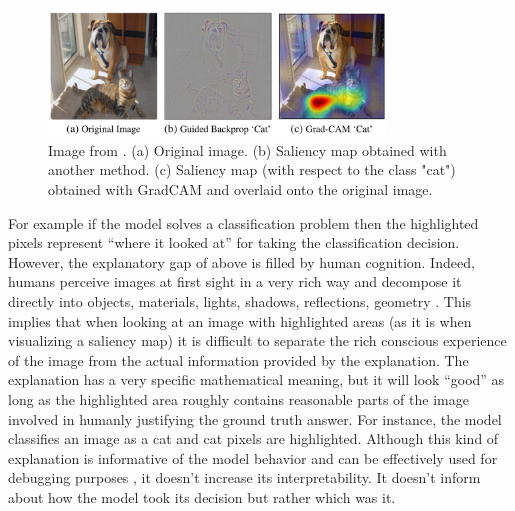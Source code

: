 \begin{figure}
    \centering
    \includegraphics[width=0.8\textwidth]{figs/grad_cam}
    \caption{
        Image from \cite{GradCAM}.
        (a) Original image.
        (b) Saliency map obtained with another method.
        (c) Saliency map (with respect to the class "cat") obtained with GradCAM and overlaid onto the original image.
        \label{fig:grad_cam}
    }
\end{figure}

For example if the model solves a classification problem then the highlighted pixels represent “where it looked at” for taking the classification decision.
However, the explanatory gap of above is filled by human cognition.
Indeed, humans perceive images at first sight in a very rich way and decompose it directly into objects, materials, lights, shadows, reflections, geometry \cite{pinker2009mind}.
This implies that when looking at an image with highlighted areas (as it is when visualizing a saliency map) it is difficult to separate the rich conscious experience of the image from the actual information provided by the explanation.
The explanation has a very specific mathematical meaning, but it will look “good” as long as the highlighted area roughly contains reasonable parts of the image involved in humanly justifying the ground truth answer.
For instance, the model classifies an image as a cat and cat pixels are highlighted.
Although this kind of explanation is informative of the model behavior and can be 
effectively used for debugging purposes \cite{molnar2022}, it doesn't increase its interpretability.
It doesn't inform about how the model took its decision but rather which was it. 


